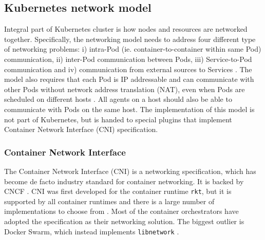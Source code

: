 \documentclass[english, 12pt, a4paper, sci, utf8, a-2b, online]{aaltothesis}
\begin{document}
\subsection{Kubernetes network model}



Integral part of Kubernetes cluster is how nodes and resources are networked together. Specifically, the networking model needs to address four different type of networking problems: i) intra-Pod (ie. container-to-container within same Pod) communication, ii) inter-Pod communication between Pods, iii) Service-to-Pod communication and iv) communication from external sources to Services \cite{k8s-docs-cluster-networking}. The model also requires that each Pod is IP addressable and can communicate with other Pods without network address translation (NAT), even when Pods are scheduled on different hosts \cite{qi2020assessing}. All agents on a host should also be able to communicate with Pods on the same host. The implementation of this model is not part of Kubernetes, but is handed to special plugins that implement Container Network Interface (CNI) specification.

\subsubsection{Container Network Interface} \label{cni}

The Container Network Interface (CNI) \cite{cni} is a networking specification, which has become de facto industry standard for container networking. It is backed by CNCF \cite{qi2020assessing}. CNI was first developed for the container runtime \texttt{rkt}, but it is supported by all container runtimes and there is a large number of implementations to choose from \cite{hausenblas2018container}. Most of the container orchestrators have adopted the specification as their networking solution. The biggest outlier is Docker Swarm, which instead implements \texttt{libnetwork} \cite{libnetwork}.
\end{document}
